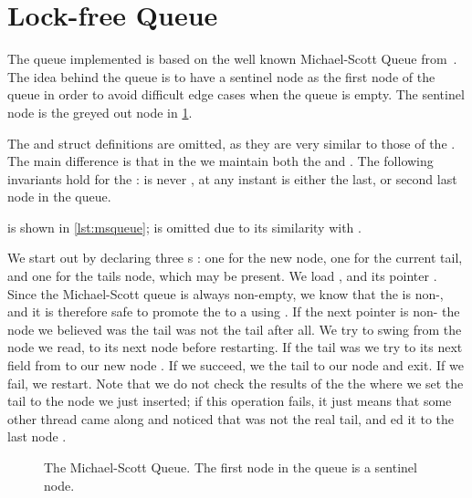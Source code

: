 \section{Lock-free Queue\label{sec:usage-queue}}


The queue implemented is based on the well known Michael-Scott Queue from~\cite{michael1996simple}.
The idea behind the queue is to have a sentinel node as the first node of the queue in order to
avoid difficult edge cases when the queue is empty. The sentinel node is the greyed out node in
\cref{fig:msqueue}.

The  and  struct definitions are omitted, as they are very similar to
those of the . The main difference is that in the  we maintain both the
 and . The following invariants hold for the :  is
never , at any instant  is either the last, or second last node in the
queue.

 is shown in \cref{lst:msqueue};  is omitted due
to its similarity with .

\begin{figure}[ht]

\end{figure}

We start out by declaring three s : one for the new node, one for the
current tail, and one for the tails  node, which may be present.  We load 
, and its  pointer .  Since the Michael-Scott queue is always
non-empty, we know that the  is non-, and it is therefore safe to promote the
 to a  using .  If the next pointer is non-
the node we believed was the tail was not the tail after all. We try to swing  from the
node we read, to its next node  before restarting.  If the tail was  we try
to  its next field from  to our new node . If we succeed, we
 the tail to our node and exit. If we fail, we restart.  Note that we do not check the
results of the the  where we set the tail to the node we just inserted; if this operation
fails, it just means that some other thread came along and noticed that  was not the
real tail, and ed it to the last node .

\begin{figure}[ht]
\centering

  \caption{The Michael-Scott Queue. The first node in the queue is a sentinel
  node.\label{fig:msqueue}}
\end{figure}



